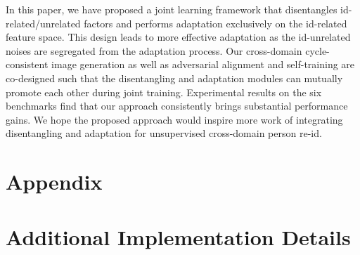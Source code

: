 \documentclass[runningheads]{llncs}
\begin{document}
In this paper, we have proposed a joint learning framework that disentangles id-related/unrelated factors and performs adaptation exclusively on the id-related feature space. This design leads to more effective adaptation as the id-unrelated noises are segregated from the adaptation process. Our cross-domain cycle-consistent image generation as well as adversarial alignment and self-training are co-designed such that the disentangling and adaptation modules can mutually promote each other during joint training. Experimental results on the six benchmarks find that our approach consistently brings substantial performance gains. We hope the proposed approach would inspire more work of integrating disentangling and adaptation for unsupervised cross-domain person re-id.






















\clearpage



\clearpage

\section*{Appendix}

\setcounter{table}{2}
\setcounter{figure}{6}

\appendix

\section{Additional Implementation Details}
\end{document}
